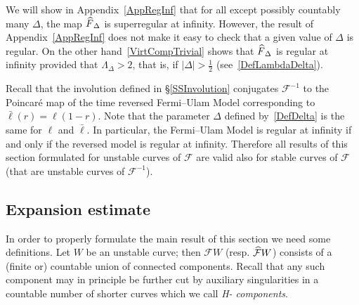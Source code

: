 \documentclass[AHL, Unicode, longabstracts,published]{cedram}
\newcommand{\inv}{^{-1}}
\newcommand{\cm}{\mathcal{F}}
\newcommand{\cmp}{\hat\cm}
\newcommand{\Hcomps}{H-\hskip0pt components}
\newcommand{\nf}{\hat F}
\let\oldhat\hat
\renewcommand*{\hat}[1]{\mathchoice{\widehat{#1}}{\widehat{#1}}{\oldhat{#1}}{\oldhat{#1}}}
\begin{document}
\begin{rema}\label{RkDeltaHalf}
We will show in Appendix~\ref{AppRegInf} that for all except possibly countably many $\Delta$, the map $\nf_\Delta$ is superregular at infinity. However, the result of Appendix~\ref{AppRegInf} does not make it easy to check that a given value of $\Delta$ is regular. On the other hand~\eqref{VirtCompTrivial} shows that $\nf_\Delta$ is regular at infinity provided that $\Lambda_\Delta>2$, that is, if $|\Delta|>\frac{1}{2}$ (see~\eqref{DefLambdaDelta}).
\end{rema}

Recall that the involution defined in \S\ref{SSInvolution} conjugates $\cm^{-1}$ to the Poincaré map of the time reversed Fermi--Ulam Model corresponding to $\bar{\ell}(r)=\ell(1-r)$. Note that the parameter $\Delta$ defined by~\eqref{DefDelta} is the same for $\ell$ and $\bar{\ell}$. In particular, the Fermi--Ulam Model is regular at infinity if and only if the reversed model is regular at infinity. Therefore all results of this section formulated for unstable curves of $\cm$ are valid also for stable curves of $\cm$ (that are unstable curves of $\cm\inv$).


\subsection{Expansion estimate}\label{SSEe}
In order to properly formulate the main result of this section we need some definitions. Let $W$ be an unstable curve; then $\cm W$ (resp. $\cmp W$) consists of a (finite or) countable union of connected components. Recall that any such component may in principle be further cut by auxiliary singularities in a countable number of shorter curves which we call \emph{\Hcomps{}}.
\end{document}
